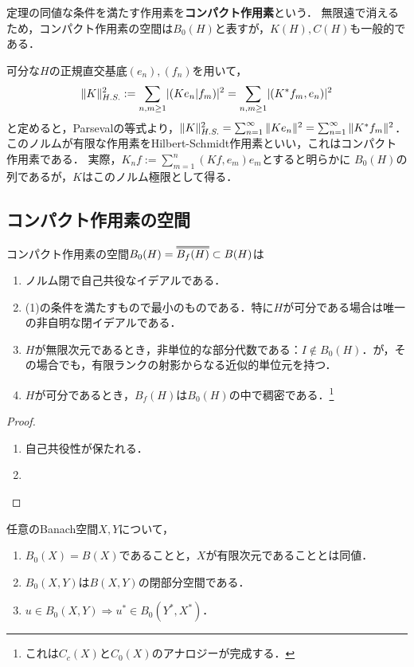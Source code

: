 \documentclass[uplatex,dvipdfmx]{jsreport}
\begin{document}
\begin{definition}
    定理の同値な条件を満たす作用素を\textbf{コンパクト作用素}という．
    無限遠で消えるため，コンパクト作用素の空間は$B_0(H)$と表すが，$K(H),C(H)$も一般的である．
\end{definition}

\begin{example}
    可分な$H$の正規直交基底$(e_n),(f_n)$を用いて，
    \[\|K\|_{H.S.}^2:=\sum_{n,m\ge1}\lvert(Ke_n|f_m)\rvert^2=\sum_{n,m\ge1}\lvert(K^*f_m,e_n)\rvert^2\]
    と定めると，Parsevalの等式より，$\|K\|^2_{H.S.}=\sum^\infty_{n=1}\|Ke_n\|^2=\sum^\infty_{n=1}\|K^*f_m\|^2$．
    このノルムが有限な作用素をHilbert-Schmidt作用素といい，これはコンパクト作用素である．
    実際，$K_nf:=\sum^n_{m=1}(Kf,e_m)e_m$とすると明らかに
    $B_0(H)$の列であるが，$K$はこのノルム極限として得る．
\end{example}

\subsection{コンパクト作用素の空間}

\begin{lemma}[コンパクト作用素の空間の描像]
    コンパクト作用素の空間$B_0(H)=\oo{B_f(H)}\subset B(H)$は
    \begin{enumerate}
        \item ノルム閉で自己共役なイデアルである．
        \item (1)の条件を満たすもので最小のものである．特に$H$が可分である場合は唯一の非自明な閉イデアルである．
        \item $H$が無限次元であるとき，非単位的な部分代数である：$I\notin B_0(H)$．が，その場合でも，有限ランクの射影からなる近似的単位元を持つ．
        \item $H$が可分であるとき，$B_f(H)$は$B_0(H)$の中で稠密である．\footnote{これは$C_c(X)$と$C_0(X)$のアナロジーが完成する．}
    \end{enumerate}
\end{lemma}
\begin{proof}\mbox{}
    \begin{enumerate}
        \item 自己共役性が保たれる．
        \item 
    \end{enumerate}
\end{proof}

\begin{proposition}
    任意のBanach空間$X,Y$について，
    \begin{enumerate}
        \item $B_0(X)=B(X)$であることと，$X$が有限次元であることとは同値．
        \item $B_0(X,Y)$は$B(X,Y)$の閉部分空間である．
        \item $u\in B_0(X,Y)\Rightarrow u^*\in B_0(Y^*,X^*)$．
    \end{enumerate}
\end{proposition}
\end{document}
